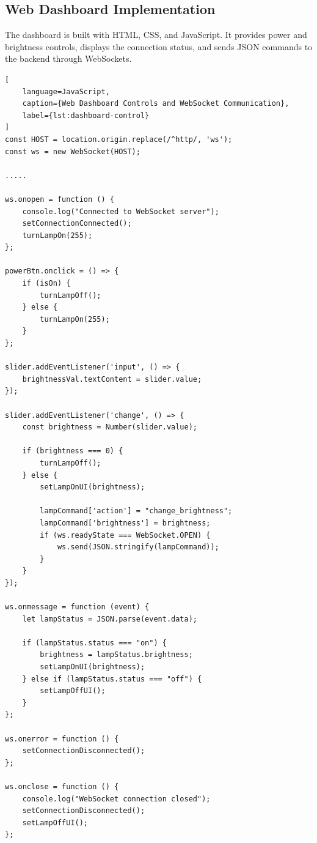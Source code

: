 \documentclass[12pt,a4paper]{article}
\begin{document}
\newpage
\subsection*{Web Dashboard Implementation}

The dashboard is built with HTML, CSS, and JavaScript.
It provides power and brightness controls, displays the
connection status, and sends JSON commands to the backend
through WebSockets.

\vspace{1cm}

\begin{lstlisting}[
    language=JavaScript,
    caption={Web Dashboard Controls and WebSocket Communication},
    label={lst:dashboard-control}
]
const HOST = location.origin.replace(/^http/, 'ws');
const ws = new WebSocket(HOST);

.....

ws.onopen = function () {
    console.log("Connected to WebSocket server");
    setConnectionConnected();
    turnLampOn(255);
};

powerBtn.onclick = () => {
    if (isOn) {
        turnLampOff();
    } else {
        turnLampOn(255);
    }
};

slider.addEventListener('input', () => {
    brightnessVal.textContent = slider.value;
});

slider.addEventListener('change', () => {
    const brightness = Number(slider.value);

    if (brightness === 0) {
        turnLampOff();
    } else {
        setLampOnUI(brightness);

        lampCommand['action'] = "change_brightness";
        lampCommand['brightness'] = brightness;
        if (ws.readyState === WebSocket.OPEN) {
            ws.send(JSON.stringify(lampCommand));
        }
    }
});

ws.onmessage = function (event) {
    let lampStatus = JSON.parse(event.data);

    if (lampStatus.status === "on") {
        brightness = lampStatus.brightness;
        setLampOnUI(brightness);
    } else if (lampStatus.status === "off") {
        setLampOffUI();
    }
};

ws.onerror = function () {
    setConnectionDisconnected();
};

ws.onclose = function () {
    console.log("WebSocket connection closed");
    setConnectionDisconnected();
    setLampOffUI();
};
\end{lstlisting}
\end{document}
